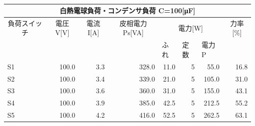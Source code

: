 \documentclass[titlepage]{jarticle}
\begin{document}
\begin{table}[htbp]
    \caption{}
    \begin{tabular}{l|r|r|r|r|r|r|r}
        \multicolumn{ 8}{c}{白熱電球負荷・コンデンサ負荷 C=100[μF]}                                                                                                                                                                                                       \\ \hline
        \multicolumn{ 1}{c|}{負荷スイッチ} & \multicolumn{ 1}{c|}{電圧V[V]} & \multicolumn{ 1}{c|}{電流I[A]} & \multicolumn{ 1}{c|}{皮相電力Ps[VA]} & \multicolumn{ 3}{c|}{電力[W]} & \multicolumn{ 1}{c|}{力率[\%]}                                                      \\ \cline{ 5- 7}
        \multicolumn{ 1}{c|}{}             & \multicolumn{ 1}{c|}{}         & \multicolumn{ 1}{c|}{}         & \multicolumn{ 1}{c|}{}               & \multicolumn{1}{l|}{ふれ}     & \multicolumn{1}{l|}{定数}      & \multicolumn{1}{l|}{電力P} & \multicolumn{ 1}{c}{} \\ \hline \hline
        S1                                 & 100.0                          & 3.3                            & 328.0                                & 11.0                          & 5                              & 55.0                       & 16.8                  \\ \hline
        S2                                 & 100.0                          & 3.4                            & 339.0                                & 21.0                          & 5                              & 105.0                      & 31.0                  \\ \hline
        S3                                 & 100.0                          & 3.6                            & 360.0                                & 31.0                          & 5                              & 155.0                      & 43.1                  \\ \hline
        S4                                 & 100.0                          & 3.9                            & 385.0                                & 42.5                          & 5                              & 212.5                      & 55.2                  \\ \hline
        S5                                 & 100.0                          & 4.2                            & 416.0                                & 52.5                          & 5                              & 262.5                      & 63.1                  \\ \hline
    \end{tabular}
    \label{}
\end{table}
\newpage
\end{document}
